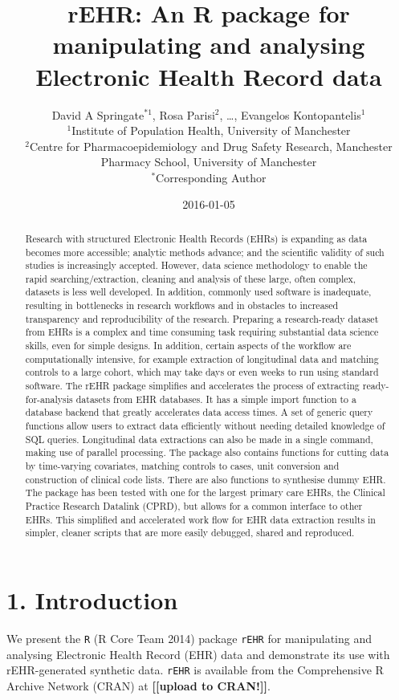 \documentclass[]{article}
\title{rEHR: An R package for manipulating and analysing Electronic Health
Record data}
\author{David A Springate\(^{*1}\), Rosa Parisi\(^{2}\), \ldots{}, Evangelos
Kontopantelis\(^{1}\) \\ \(^{1}\)Institute of Population Health, University of Manchester \\ \(^{2}\)Centre for Pharmacoepidemiology and Drug Safety Research,
Manchester Pharmacy School, University of Manchester \\ \(^{*}\)Corresponding Author}
\date{2016-01-05}
\begin{document}
\maketitle

\begin{abstract}
Research with structured Electronic Health Records (EHRs) is expanding
as data becomes more accessible; analytic methods advance; and the
scientific validity of such studies is increasingly accepted. However,
data science methodology to enable the rapid searching/extraction,
cleaning and analysis of these large, often complex, datasets is less
well developed. In addition, commonly used software is inadequate,
resulting in bottlenecks in research workflows and in obstacles to
increased transparency and reproducibility of the research. Preparing a
research-ready dataset from EHRs is a complex and time consuming task
requiring substantial data science skills, even for simple designs. In
addition, certain aspects of the workflow are computationally intensive,
for example extraction of longitudinal data and matching controls to a
large cohort, which may take days or even weeks to run using standard
software. The rEHR package simplifies and accelerates the process of
extracting ready-for-analysis datasets from EHR databases. It has a
simple import function to a database backend that greatly accelerates
data access times. A set of generic query functions allow users to
extract data efficiently without needing detailed knowledge of SQL
queries. Longitudinal data extractions can also be made in a single
command, making use of parallel processing. The package also contains
functions for cutting data by time-varying covariates, matching controls
to cases, unit conversion and construction of clinical code lists. There
are also functions to synthesise dummy EHR. The package has been tested
with one for the largest primary care EHRs, the Clinical Practice
Research Datalink (CPRD), but allows for a common interface to other
EHRs. This simplified and accelerated work flow for EHR data extraction
results in simpler, cleaner scripts that are more easily debugged,
shared and reproduced.
\end{abstract}

\section{1. Introduction}\label{introduction}

We present the \texttt{R} (R Core Team 2014) package \texttt{rEHR} for
manipulating and analysing Electronic Health Record (EHR) data and
demonstrate its use with rEHR-generated synthetic data. \texttt{rEHR} is
available from the Comprehensive R Archive Network (CRAN) at
\textbf{{[}{[}upload to CRAN!{]}{]}}.
\end{document}
